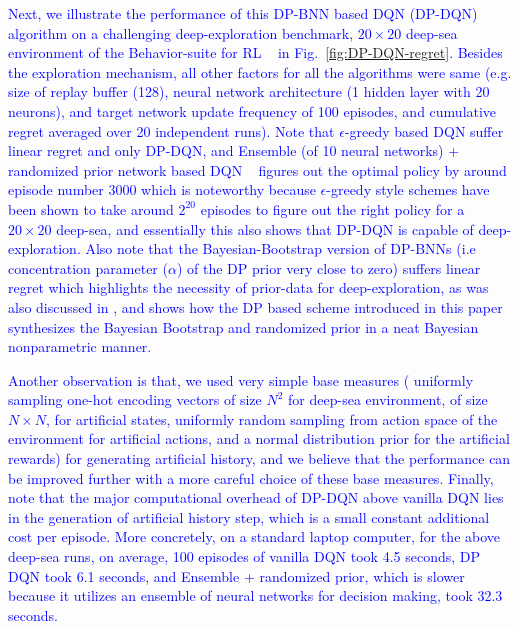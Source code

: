 \documentclass[10pt]{article}
\begin{document}
\textcolor{blue}{
Next, we illustrate the performance of this DP-BNN based DQN (DP-DQN) algorithm on a challenging deep-exploration benchmark, $20 \times 20$ deep-sea environment of the Behavior-suite for RL ~\citep{osband2019behaviour} in Fig.~\ref{fig:DP-DQN-regret}. Besides the exploration mechanism, all other factors for all the algorithms were same (e.g. size of replay buffer (128), neural network architecture (1 hidden layer with 20 neurons), and target network update frequency of 100 episodes, and cumulative regret averaged over 20 independent runs).  Note that $\epsilon$-greedy based DQN suffer linear regret and only  DP-DQN, and Ensemble (of 10 neural networks) + randomized prior network based DQN ~\citep{osband2019deep}  figures out the optimal policy by around episode number 3000 which is noteworthy because $\epsilon$-greedy style schemes have been shown to take around $2^{20}$ episodes to figure out the right policy for a $20 \times 20$ deep-sea, and essentially this also shows that DP-DQN is capable of deep-exploration. Also note that the Bayesian-Bootstrap version of DP-BNNs (i.e concentration parameter ($\alpha$) of the DP prior very close to zero) suffers linear regret  which highlights the necessity of prior-data for deep-exploration, as was also discussed in \citep{osband2018randomized}, and shows how the DP based scheme introduced in this paper synthesizes the Bayesian Bootstrap and randomized prior in a neat Bayesian nonparametric manner. }

\textcolor{blue}{
Another observation is that, we used very simple base measures ( uniformly sampling one-hot encoding vectors of size $N^{2}$ for deep-sea environment, of size $N \times N$, for artificial states, uniformly random sampling from action space of the environment for artificial actions, and a normal distribution prior for the artificial rewards) for generating artificial history, and we believe that the performance can be improved further with a more careful choice of these base measures. Finally, note that the major computational overhead of DP-DQN above vanilla DQN lies in the generation of artificial history step, which is a small constant additional cost per episode. More concretely, on a standard laptop computer, for the above deep-sea runs, on average, 100 episodes of vanilla DQN took 4.5 seconds, DP DQN took 6.1 seconds, and Ensemble + randomized prior, which is slower because it utilizes an ensemble of neural networks for decision making, took 32.3 seconds. }
\end{document}

